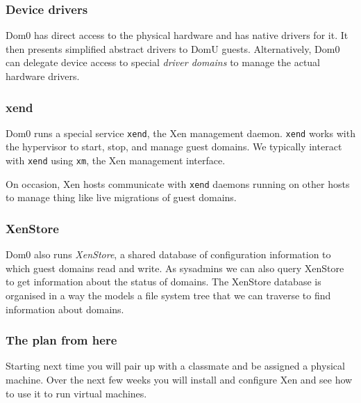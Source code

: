 \documentclass[10pt]{beamer}
\begin{document}
\begin{frame}
  \frametitle{Device drivers}
  
  Dom0 has direct access to the physical hardware and has native drivers for it. It then presents simplified abstract drivers to DomU guests. Alternatively, Dom0 can delegate device access to special \emph{driver domains} to manage the actual hardware drivers. 
  
  \vspace{5mm}
             
\end{frame}

\begin{frame}
  \frametitle{xend}
  
  Dom0 runs a special service \texttt{xend}, the Xen management daemon.  \texttt{xend} works with the hypervisor to start, stop, and manage guest domains. 
  We typically interact with \texttt{xend} using \texttt{xm}, the Xen management interface.         
  
  \vspace{5mm}
  
  On occasion, Xen hosts communicate with \texttt{xend} daemons running on other hosts to manage thing like live migrations of guest domains.   
\end{frame}

\begin{frame}
  \frametitle{XenStore}
  
  Dom0 also runs \emph{XenStore}, a shared database of configuration information to which guest domains read and write.  As sysadmins we can also 
  query XenStore to get information about the status of domains. The XenStore database is organised in a way the models a file system tree that we can traverse to 
  find information about domains.
\end{frame}

\begin{frame}
  \frametitle{The plan from here}
  
  Starting next time you will pair up with a classmate and be assigned a physical machine. Over the next few weeks you will install and configure Xen and see 
  how to use it to run virtual machines.
  
\end{frame}
\end{document}
